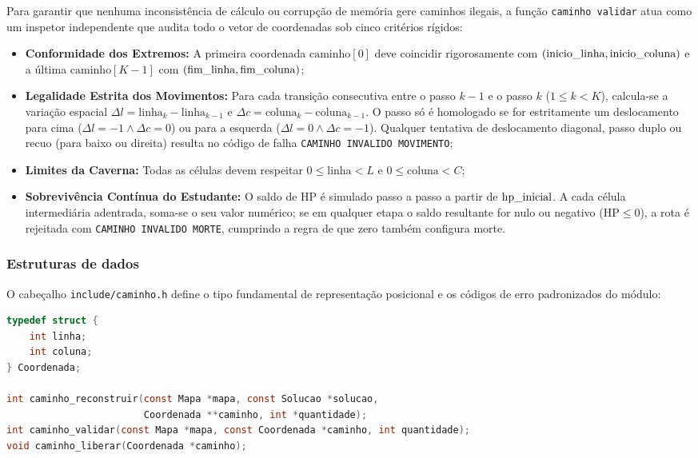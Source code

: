 \documentclass[12pt,a4paper]{article}
\makeatletter
\DeclareRobustCommand{\_}{%
  \ifmmode
    \nfss@text{\textunderscore}%
  \else
    \textunderscore\allowbreak
  \fi
}
\makeatother
\begin{document}
Para garantir que nenhuma inconsistência de cálculo ou corrupção de memória gere caminhos ilegais, a função \texttt{caminho\_validar} atua como um inspetor independente que audita todo o vetor de coordenadas sob cinco critérios rígidos:
\begin{itemize}
    \item \textbf{Conformidade dos Extremos:} A primeira coordenada $\text{caminho}[0]$ deve coincidir rigorosamente com $(\text{inicio\_linha}, \text{inicio\_coluna})$ e a última $\text{caminho}[K-1]$ com $(\text{fim\_linha}, \text{fim\_coluna})$;
    \item \textbf{Legalidade Estrita dos Movimentos:} Para cada transição consecutiva entre o passo $k-1$ e o passo $k$ ($1 \le k < K$), calcula-se a variação espacial $\Delta l = \text{linha}_k - \text{linha}_{k-1}$ e $\Delta c = \text{coluna}_k - \text{coluna}_{k-1}$. O passo só é homologado se for estritamente um deslocamento para cima ($\Delta l = -1 \land \Delta c = 0$) ou para a esquerda ($\Delta l = 0 \land \Delta c = -1$). Qualquer tentativa de deslocamento diagonal, passo duplo ou recuo (para baixo ou direita) resulta no código de falha \texttt{CAMINHO\_INVALIDO\_MOVIMENTO};
    \item \textbf{Limites da Caverna:} Todas as células devem respeitar $0 \le \text{linha} < L$ e $0 \le \text{coluna} < C$;
    \item \textbf{Sobrevivência Contínua do Estudante:} O saldo de HP é simulado passo a passo a partir de $\text{hp\_inicial}$. A cada célula intermediária adentrada, soma-se o seu valor numérico; se em qualquer etapa o saldo resultante for nulo ou negativo ($\text{HP} \le 0$), a rota é rejeitada com \texttt{CAMINHO\_INVALIDO\_MORTE}, cumprindo a regra de que zero também configura morte.
\end{itemize}

\subsubsection*{Estruturas de dados}

O cabeçalho \texttt{include/caminho.h} define o tipo fundamental de representação posicional e os códigos de erro padronizados do módulo:

\begin{lstlisting}[language=C, caption={Estrutura Coordenada e assinaturas públicas do módulo caminho.}]
typedef struct {
    int linha;
    int coluna;
} Coordenada;

int caminho_reconstruir(const Mapa *mapa, const Solucao *solucao,
                        Coordenada **caminho, int *quantidade);
int caminho_validar(const Mapa *mapa, const Coordenada *caminho, int quantidade);
void caminho_liberar(Coordenada *caminho);
\end{lstlisting}
\end{document}
